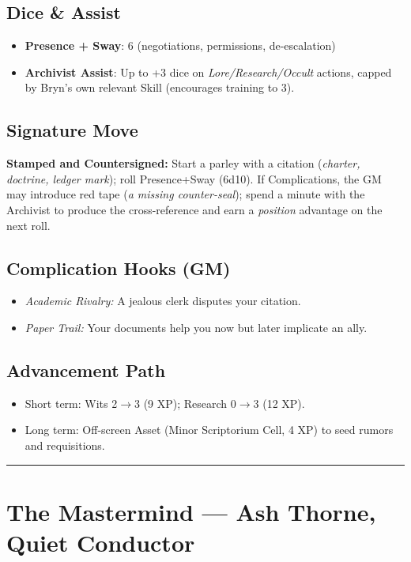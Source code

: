 \documentclass[12pt]{book}
\begin{document}
\subsection*{Dice \& Assist}
\begin{itemize}
  \item \textbf{Presence + Sway}: 6 (negotiations, permissions, de-escalation)
  \item \textbf{Archivist Assist}: Up to +3 dice on \emph{Lore/Research/Occult} actions, capped by Bryn’s own relevant Skill (encourages training to 3).
\end{itemize}

\subsection*{Signature Move}
\textbf{Stamped and Countersigned:} Start a parley with a citation (\emph{charter, doctrine, ledger mark}); roll Presence+Sway (6d10). If Complications, the GM may introduce red tape (\emph{a missing counter-seal}); spend a minute with the Archivist to produce the cross-reference and earn a \emph{position} advantage on the next roll.

\subsection*{Complication Hooks (GM)}
\begin{itemize}
  \item \emph{Academic Rivalry:} A jealous clerk disputes your citation.
  \item \emph{Paper Trail:} Your documents help you now but later implicate an ally.
\end{itemize}

\subsection*{Advancement Path}
\begin{itemize}
  \item Short term: Wits 2$\rightarrow$3 (9 XP); Research 0$\rightarrow$3 (12 XP).
  \item Long term: Off-screen Asset (Minor Scriptorium Cell, 4 XP) to seed rumors and requisitions.
\end{itemize}

\bigskip
\hrule
\bigskip

\section{The Mastermind — Ash Thorne, Quiet Conductor}
\end{document}
